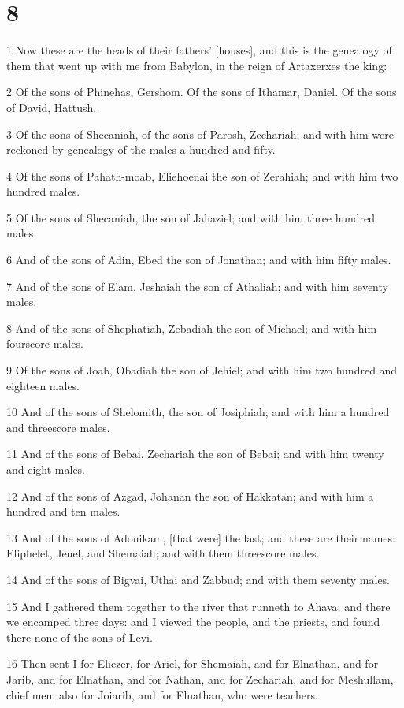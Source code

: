 \chapter{8}

\par 1 Now these are the heads of their fathers' [houses], and this is the genealogy of them that went up with me from Babylon, in the reign of Artaxerxes the king:
\par 2 Of the sons of Phinehas, Gershom. Of the sons of Ithamar, Daniel. Of the sons of David, Hattush.
\par 3 Of the sons of Shecaniah, of the sons of Parosh, Zechariah; and with him were reckoned by genealogy of the males a hundred and fifty.
\par 4 Of the sons of Pahath-moab, Eliehoenai the son of Zerahiah; and with him two hundred males.
\par 5 Of the sons of Shecaniah, the son of Jahaziel; and with him three hundred males.
\par 6 And of the sons of Adin, Ebed the son of Jonathan; and with him fifty males.
\par 7 And of the sons of Elam, Jeshaiah the son of Athaliah; and with him seventy males.
\par 8 And of the sons of Shephatiah, Zebadiah the son of Michael; and with him fourscore males.
\par 9 Of the sons of Joab, Obadiah the son of Jehiel; and with him two hundred and eighteen males.
\par 10 And of the sons of Shelomith, the son of Josiphiah; and with him a hundred and threescore males.
\par 11 And of the sons of Bebai, Zechariah the son of Bebai; and with him twenty and eight males.
\par 12 And of the sons of Azgad, Johanan the son of Hakkatan; and with him a hundred and ten males.
\par 13 And of the sons of Adonikam, [that were] the last; and these are their names: Eliphelet, Jeuel, and Shemaiah; and with them threescore males.
\par 14 And of the sons of Bigvai, Uthai and Zabbud; and with them seventy males.
\par 15 And I gathered them together to the river that runneth to Ahava; and there we encamped three days: and I viewed the people, and the priests, and found there none of the sons of Levi.
\par 16 Then sent I for Eliezer, for Ariel, for Shemaiah, and for Elnathan, and for Jarib, and for Elnathan, and for Nathan, and for Zechariah, and for Meshullam, chief men; also for Joiarib, and for Elnathan, who were teachers.
